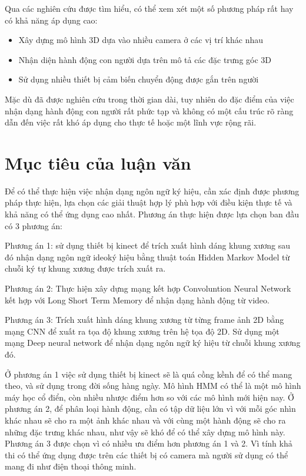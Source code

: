 Qua các nghiên cứu được tìm hiểu, có thể xem xét một số phương pháp rất hay có khả năng áp dụng cao:
\begin{itemize}
\item Xây dựng mô hình 3D dựa vào nhiều camera ở các vị trí khác nhau \cite{HLUT1}
\item Nhận diện hành động con người dựa trên mô tả các đặc trưng góc 3D \cite{6693448}
\item Sử dụng nhiều thiết bị cảm biến chuyển động được gắn trên người \cite{4650859}
\end{itemize}

Mặc dù đã được nghiên cứu trong thời gian dài, tuy nhiên do đặc điểm của việc nhận dạng hành động con người rất phức tạp và không có một cấu trúc rõ ràng dẫn đến việc rất khó áp dụng cho thực tế hoặc một lĩnh vực rộng rãi.

\section{Mục tiêu của luận văn}

Để có thể thực hiện việc nhận dạng ngôn ngữ ký hiệu, cần xác định được phương pháp thực hiện, lựa chọn các giải thuật hợp lý phù hợp với điều kiện thực tế và khả năng có thể ứng dụng cao nhất.
Phương án thực hiện được lựa chọn ban đầu có 3 phương án: 

Phương án 1: sử dụng thiết bị kinect để trích xuất hình dáng khung xương sau đó nhận dạng ngôn ngữ ideoký hiệu bằng thuật toán Hidden Markov Model từ chuỗi ký tự khung xương được trích xuất ra.

Phương án 2: Thực hiện xây dựng mạng kết hợp Convoluntion Neural Network kết hợp với Long Short Term Memory để nhận dạng hành động từ video.

Phương án 3: Trích xuất hình dáng khung xương từ từng frame ảnh 2D bằng mạng CNN để xuất ra tọa độ khung xương trên hệ tọa độ 2D. Sử dụng một mạng Deep neural network để nhận dạng ngôn ngữ ký hiệu từ chuỗi khung xương đó.

Ở phương án 1 việc sử dụng thiết bị kinect sẽ là quá cồng kềnh để có thể mang theo, và sử dụng trong đời sống hàng ngày. Mô hình HMM có thể là một mô hình máy học cổ điển, còn nhiều nhược điểm hơn so với các mô hình mới hiện nay. Ở phương án 2, để phân loại hành động, cần có tập dữ liệu lớn vì với mỗi góc nhìn khác nhau sẽ cho ra một ảnh khác nhau và với cùng một hành động sẽ cho ra những đặc trưng khác nhau, như vậy sẽ khó để có thể xây dựng mô hình này. Phương án 3 được chọn vì có nhiều ưu điểm hơn phương án 1 và 2. Vì tính khả thi có thể ứng dụng được trên các thiết bị có camera mà người sử dụng có thể mang đi như điện thoại thông minh.

